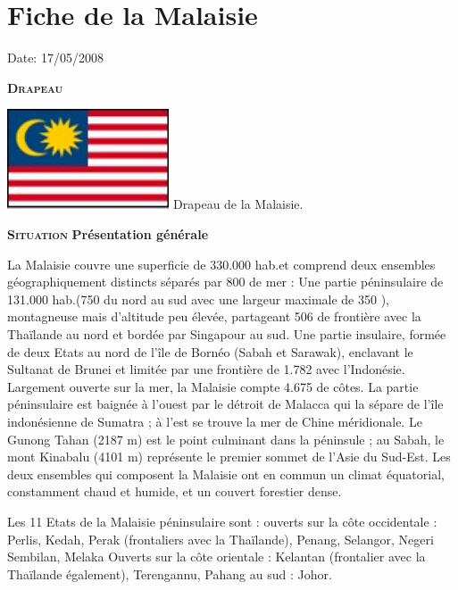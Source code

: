 \section{Fiche de la Malaisie}

Date: 17/05/2008

\begin{multicols}{2}

\textbf{\textsc{Drapeau}}

\hspace*{-0.65cm}
\includegraphics[width=4.8cm]{articles/Fiche-de-la-malaisie/1210328778gbyq.jpg}
Drapeau de la Malaisie.


\textbf{\textsc{Situation}}
\textbf{Présentation générale}

La Malaisie couvre une superficie de 330.000 hab.\kilo\meter\squared et comprend deux ensembles géographiquement distincts séparés par 800 \kilo\meter de mer :  Une partie péninsulaire de 131.000 hab.\kilo\meter\squared (750 \kilo\meter du nord au sud avec une largeur maximale de 350 \kilo\meter), montagneuse mais d'altitude peu élevée, partageant 506 \kilo\meter de frontière avec la Thaïlande au nord et bordée par Singapour au sud.
Une partie insulaire, formée de deux Etats au nord de l'île de Bornéo (Sabah et Sarawak), enclavant le Sultanat de Brunei et limitée par une frontière de 1.782 \kilo\meter avec l'Indonésie. Largement ouverte sur la mer, la Malaisie compte 4.675 \kilo\meter de côtes. La partie péninsulaire est baignée à l'ouest par le détroit de Malacca qui la sépare de l'île indonésienne de Sumatra ; à l'est se trouve la mer de Chine méridionale. Le Gunong Tahan (2187 m) est le point culminant dans la péninsule ; au Sabah, le mont Kinabalu (4101 m) représente le premier sommet de l'Asie du Sud-Est. Les deux ensembles qui composent la Malaisie ont en commun un climat équatorial, constamment chaud et humide, et un couvert forestier dense.

Les 11 Etats de la Malaisie péninsulaire sont :  ouverts sur la côte occidentale : Perlis, Kedah, Perak (frontaliers avec la Thaïlande), Penang, Selangor, Negeri Sembilan, Melaka Ouverts sur la côte orientale : Kelantan (frontalier avec la Thaïlande également), Terengannu, Pahang au sud : Johor.


\end{multicols}
